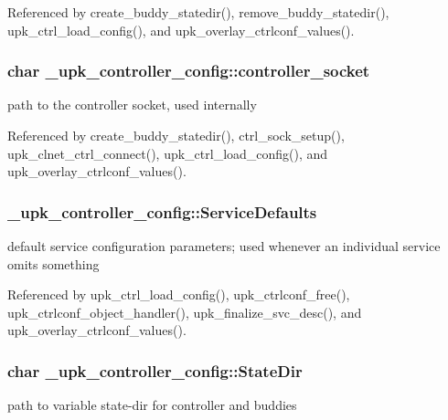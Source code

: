 Referenced by create\_\-buddy\_\-statedir(), remove\_\-buddy\_\-statedir(), upk\_\-ctrl\_\-load\_\-config(), and upk\_\-overlay\_\-ctrlconf\_\-values().

\subsubsection[{controller\_\-socket}]{\setlength{\rightskip}{0pt plus 5cm}char {\bf \_\-upk\_\-controller\_\-config::controller\_\-socket}}\label{struct__upk__controller__config_ae66e6cd298ca71d88bfedd0d565de3f0}
path to the controller socket, used internally 

Referenced by create\_\-buddy\_\-statedir(), ctrl\_\-sock\_\-setup(), upk\_\-clnet\_\-ctrl\_\-connect(), upk\_\-ctrl\_\-load\_\-config(), and upk\_\-overlay\_\-ctrlconf\_\-values().

\subsubsection[{ServiceDefaults}]{ {\bf \_\-upk\_\-controller\_\-config::ServiceDefaults}}\label{struct__upk__controller__config_a31100d724637fed5b3dc4003fbc145c2}
default service configuration parameters; used whenever an individual service omits something 

Referenced by upk\_\-ctrl\_\-load\_\-config(), upk\_\-ctrlconf\_\-free(), upk\_\-ctrlconf\_\-object\_\-handler(), upk\_\-finalize\_\-svc\_\-desc(), and upk\_\-overlay\_\-ctrlconf\_\-values().

\subsubsection[{StateDir}]{\setlength{\rightskip}{0pt plus 5cm}char {\bf \_\-upk\_\-controller\_\-config::StateDir}}\label{struct__upk__controller__config_ad9c761f3f6b5af96983212c3c39a9cf3}
path to variable state-\/dir for controller and buddies 

